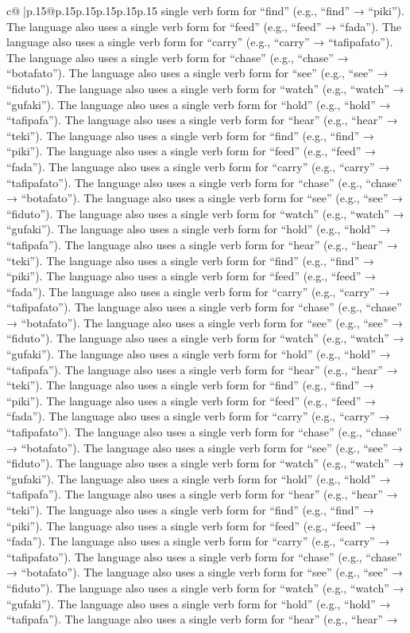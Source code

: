 \documentclass{article}
\begin{document}
{\begin{supertabular}{c@{$\;$}|p{.15\linewidth}@{}p{.15\linewidth}p{.15\linewidth}p{.15\linewidth}p{.15\linewidth}p{.15\linewidth}}
{{{single verb form for “find” (e.g., “find” → “piki”). The language also uses a single verb form for “feed” (e.g., “feed” → “fada”). The language also uses a single verb form for “carry” (e.g., “carry” → “tafipafato”). The language also uses a single verb form for “chase” (e.g., “chase” → “botafato”). The language also uses a single verb form for “see” (e.g., “see” → “fiduto”). The language also uses a single verb form for “watch” (e.g., “watch” → “gufaki”). The language also uses a single verb form for “hold” (e.g., “hold” → “tafipafa”). The language also uses a single verb form for “hear” (e.g., “hear” → “teki”). The language also uses a single verb form for “find” (e.g., “find” → “piki”). The language also uses a single verb form for “feed” (e.g., “feed” → “fada”). The language also uses a single verb form for “carry” (e.g., “carry” → “tafipafato”). The language also uses a single verb form for “chase” (e.g., “chase” → “botafato”). The language also uses a single verb form for “see” (e.g., “see” → “fiduto”). The language also uses a single verb form for “watch” (e.g., “watch” → “gufaki”). The language also uses a single verb form for “hold” (e.g., “hold” → “tafipafa”). The language also uses a single verb form for “hear” (e.g., “hear” → “teki”). The language also uses a single verb form for “find” (e.g., “find” → “piki”). The language also uses a single verb form for “feed” (e.g., “feed” → “fada”). The language also uses a single verb form for “carry” (e.g., “carry” → “tafipafato”). The language also uses a single verb form for “chase” (e.g., “chase” → “botafato”). The language also uses a single verb form for “see” (e.g., “see” → “fiduto”). The language also uses a single verb form for “watch” (e.g., “watch” → “gufaki”). The language also uses a single verb form for “hold” (e.g., “hold” → “tafipafa”). The language also uses a single verb form for “hear” (e.g., “hear” → “teki”). The language also uses a single verb form for “find” (e.g., “find” → “piki”). The language also uses a single verb form for “feed” (e.g., “feed” → “fada”). The language also uses a single verb form for “carry” (e.g., “carry” → “tafipafato”). The language also uses a single verb form for “chase” (e.g., “chase” → “botafato”). The language also uses a single verb form for “see” (e.g., “see” → “fiduto”). The language also uses a single verb form for “watch” (e.g., “watch” → “gufaki”). The language also uses a single verb form for “hold” (e.g., “hold” → “tafipafa”). The language also uses a single verb form for “hear” (e.g., “hear” → “teki”). The language also uses a single verb form for “find” (e.g., “find” → “piki”). The language also uses a single verb form for “feed” (e.g., “feed” → “fada”). The language also uses a single verb form for “carry” (e.g., “carry” → “tafipafato”). The language also uses a single verb form for “chase” (e.g., “chase” → “botafato”). The language also uses a single verb form for “see” (e.g., “see” → “fiduto”). The language also uses a single verb form for “watch” (e.g., “watch” → “gufaki”). The language also uses a single verb form for “hold” (e.g., “hold” → “tafipafa”). The language also uses a single verb form for “hear” (e.g., “hear” → }}}
\end{supertabular}}
\end{document}
